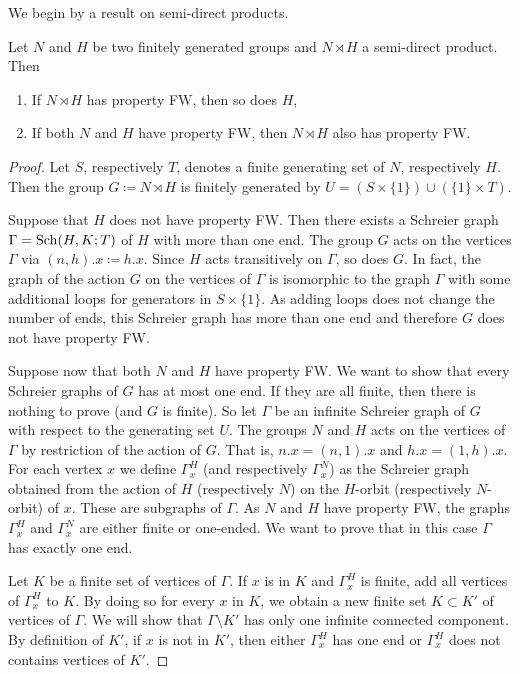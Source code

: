 We begin by a result on semi-direct products.
%
%
\begin{lem}\label{Lemma:Semidirect_ends}
Let $N$ and $H$ be two finitely generated groups and $N\rtimes H$ a semi-direct product.
Then
\begin{enumerate}
\item If $N\rtimes H$ has property FW, then so does $H$,
\item If both $N$ and $H$ have property FW, then $N\rtimes H$ also has property FW.
\end{enumerate}
\end{lem}
%
%
\begin{proof}
Let $S$, respectively $T$, denotes a finite generating set of $N$, respectively $H$.
Then the group $G\coloneqq N\rtimes H$ is finitely generated by $U=(S\times\{1\}) \cup(\{1\}\times T)$.

Suppose that $H$ does not have property FW. Then there exists a Schreier graph $\Gamma=\operatorname{Sch}(H,K;T)$ of $H$ with more than one end. The group $G$ acts on the vertices $\Gamma$ via $(n,h).x \coloneqq h.x$.
Since $H$ acts transitively on $\Gamma$, so does $G$.
In fact, the graph of the action $G$ on the vertices of $\Gamma$ is isomorphic to the graph $\Gamma$ with some additional loops for generators in $S\times\{1\}$. As adding loops does not change the number of ends, this Schreier graph has more than one end and therefore $G$ does not have property FW.

Suppose now that both $N$ and $H$ have property FW. We want to show that every Schreier graphs of $G$ has at most one end. If they are all finite, then there is nothing to prove (and $G$ is finite). So let $\Gamma$ be an infinite Schreier graph of $G$ with respect to the generating set $U$. The groups $N$ and $H$ acts on the vertices of $\Gamma$ by restriction of the action of $G$. That is, $n.x = (n,1).x$ and $h.x = (1,h).x$.
For each vertex $x$ we define $\Gamma_x^H$ (and respectively $\Gamma_x^N$) as the Schreier graph obtained from the action of $H$ (respectively $N$) on the $H$-orbit (respectively $N$-orbit) of $x$. These are subgraphs of $\Gamma$. As $N$ and $H$ have property FW, the graphs $\Gamma_x^H$ and $\Gamma_x^N$ are either finite or one-ended. We want to prove that in this case $\Gamma$ has exactly one end.

Let $K$ be a finite set of vertices of $\Gamma$.
If $x$ is in $K$ and $\Gamma_x^H$ is finite, add all vertices of $\Gamma_x^H$ to $K$.
By doing so for every $x$ in $K$, we obtain a new finite set $K\subset K'$ of vertices of $\Gamma$.
We will show that $\Gamma\setminus K'$ has only one infinite connected component.
By definition of $K'$, if $x$ is not in $K'$, then either $\Gamma_x^H$ has one end or $\Gamma_x^H$ does not contains vertices of $K'$.


\end{proof}
